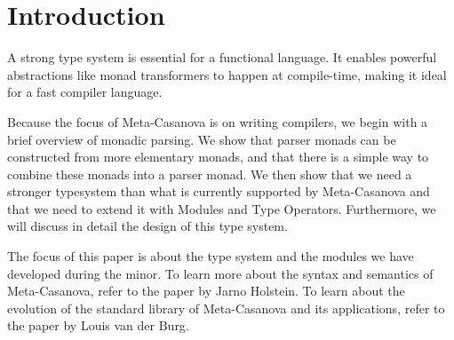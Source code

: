 \section{Introduction}
A strong type system is essential for a functional language.
It enables powerful abstractions like monad transformers to happen at compile-time,
making it ideal for a fast compiler language.

Because the focus of Meta-Casanova is on writing compilers,
we begin with a brief overview of monadic parsing.
We show that parser monads can be constructed from more elementary monads,
and that there is a simple way to combine these monads into a parser monad.
We then show that we need a stronger typesystem than what is currently supported by Meta-Casanova
and that we need to extend it with Modules and Type Operators.
Furthermore, we will discuss in detail the design of this type system.

The focus of this paper is about the type system and the modules we have developed during the minor.
To learn more about the syntax and semantics of Meta-Casanova, refer to the paper by Jarno Holstein\cite{holstein16}.
To learn about the evolution of the standard library of Meta-Casanova and its applications, refer to the paper by Louis van der Burg\cite{vanderburg16}.
